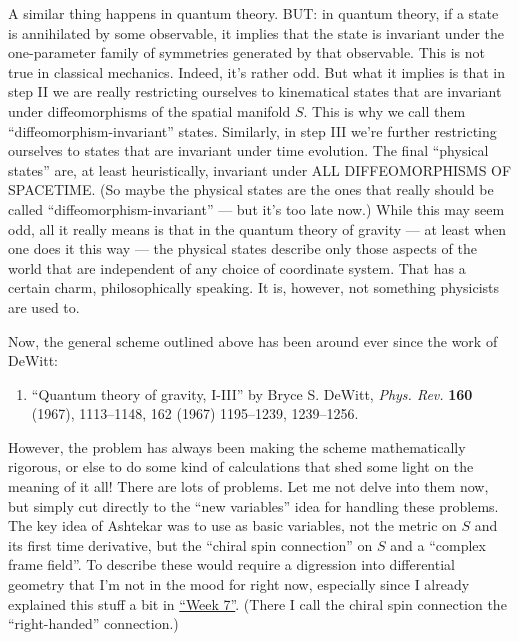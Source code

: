 \documentclass{article}
\def\tightlist{}
\begin{document}
A similar thing happens in quantum theory. BUT: in quantum theory, if a
state is annihilated by some observable, it implies that the state is
invariant under the one-parameter family of symmetries generated by that
observable. This is not true in classical mechanics. Indeed, it's rather
odd. But what it implies is that in step II we are really restricting
ourselves to kinematical states that are invariant under diffeomorphisms
of the spatial manifold \(S\). This is why we call them
``diffeomorphism-invariant'' states. Similarly, in step III we're
further restricting ourselves to states that are invariant under time
evolution. The final ``physical states'' are, at least heuristically,
invariant under ALL DIFFEOMORPHISMS OF SPACETIME. (So maybe the physical
states are the ones that really should be called
``diffeomorphism-invariant'' --- but it's too late now.) While this may
seem odd, all it really means is that in the quantum theory of gravity
--- at least when one does it this way --- the physical states describe
only those aspects of the world that are independent of any choice of
coordinate system. That has a certain charm, philosophically speaking.
It is, however, not something physicists are used to.

Now, the general scheme outlined above has been around ever since the
work of DeWitt:

\begin{enumerate}
\def\labelenumi{\arabic{enumi})}
\tightlist
\item
  ``Quantum theory of gravity, I-III'' by Bryce S. DeWitt, \emph{Phys.
  Rev.} \textbf{160} (1967), 1113--1148, 162 (1967) 1195--1239,
  1239--1256.
\end{enumerate}

However, the problem has always been making the scheme mathematically
rigorous, or else to do some kind of calculations that shed some light
on the meaning of it all! There are lots of problems. Let me not delve
into them now, but simply cut directly to the ``new variables'' idea for
handling these problems. The key idea of Ashtekar was to use as basic
variables, not the metric on \(S\) and its first time derivative, but
the ``chiral spin connection'' on \(S\) and a ``complex frame field''.
To describe these would require a digression into differential geometry
that I'm not in the mood for right now, especially since I already
explained this stuff a bit in \protect\hyperlink{week7}{``Week 7''}.
(There I call the chiral spin connection the ``right-handed''
connection.)
\end{document}
